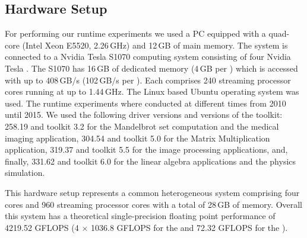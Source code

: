 \subsection{Hardware Setup}
For performing our runtime experiments we used a PC equipped with a quad-core \CPU (Intel Xeon E5520, 2.26\,GHz) and 12\,GB of main memory.
The system is connected to a Nvidia Tesla S1070 computing system consisting of four Nvidia Tesla \GPUs.
The S1070 has 16\,GB of dedicated memory (4\,GB per \GPU) which is accessed with up to 408\,GB/s (102\,GB/s per \GPU).
Each \GPU comprises 240 streaming processor cores running at up to 1.44\,GHz.
The Linux based Ubuntu operating system was used.
The runtime experiments where conducted at different times from 2010 until 2015.
We used the following \GPU driver versions and versions of the \CUDA toolkit:
258.19 and \CUDA toolkit 3.2 for the Mandelbrot set computation and the medical imaging application,
304.54 and \CUDA toolkit 5.0 for the Matrix Multiplication application,
319.37 and \CUDA toolkit 5.5 for the image processing applications, and,
finally, 331.62 and \CUDA toolkit 6.0 for the linear algebra applications and the physics simulation.

This hardware setup represents a common heterogeneous system comprising four \CPU cores and 960 \GPU streaming processor cores with a total of 28\,GB of memory.
Overall this system has a theoretical single-precision floating point performance of 4219.52 GFLOPS (4 $\times$ 1036.8 GFLOPS for the \GPUs and 72.32 GFLOPS for the \CPU).

